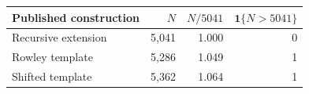 \begin{tabular}{@{}lrrr@{}}
\toprule
Published construction & $N$ & $N/5041$ & $\mathbf{1}\{N>5041\}$ \\
\midrule
Recursive extension~\citep{fredricksen2000schur} & 5,041 & 1.000 & 0 \\
Rowley template~\citep{rowley2021templates} & 5,286 & 1.049 & 1 \\
Shifted template~\citep{bengone2026schur} & 5,362 & 1.064 & 1 \\
\bottomrule
\end{tabular}
